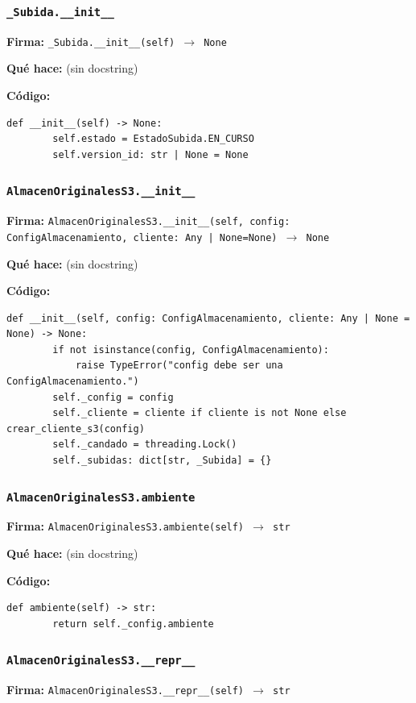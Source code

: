 \documentclass[11pt,a4paper]{article}
\begin{document}
\subsubsection*{\texttt{\_Subida.\_\_init\_\_}}
\textbf{Firma:} \texttt{\_Subida.\_\_init\_\_(self) $\rightarrow$ None}

\textbf{Qué hace:} (sin docstring)

\textbf{Código:}
\begin{lstlisting}
def __init__(self) -> None:
        self.estado = EstadoSubida.EN_CURSO
        self.version_id: str | None = None
\end{lstlisting}

\subsubsection*{\texttt{AlmacenOriginalesS3.\_\_init\_\_}}
\textbf{Firma:} \texttt{AlmacenOriginalesS3.\_\_init\_\_(self, config: ConfigAlmacenamiento, cliente: Any | None=None) $\rightarrow$ None}

\textbf{Qué hace:} (sin docstring)

\textbf{Código:}
\begin{lstlisting}
def __init__(self, config: ConfigAlmacenamiento, cliente: Any | None = None) -> None:
        if not isinstance(config, ConfigAlmacenamiento):
            raise TypeError("config debe ser una ConfigAlmacenamiento.")
        self._config = config
        self._cliente = cliente if cliente is not None else crear_cliente_s3(config)
        self._candado = threading.Lock()
        self._subidas: dict[str, _Subida] = {}
\end{lstlisting}

\subsubsection*{\texttt{AlmacenOriginalesS3.ambiente}}
\textbf{Firma:} \texttt{AlmacenOriginalesS3.ambiente(self) $\rightarrow$ str}

\textbf{Qué hace:} (sin docstring)

\textbf{Código:}
\begin{lstlisting}
def ambiente(self) -> str:
        return self._config.ambiente
\end{lstlisting}

\subsubsection*{\texttt{AlmacenOriginalesS3.\_\_repr\_\_}}
\textbf{Firma:} \texttt{AlmacenOriginalesS3.\_\_repr\_\_(self) $\rightarrow$ str}
\end{document}

